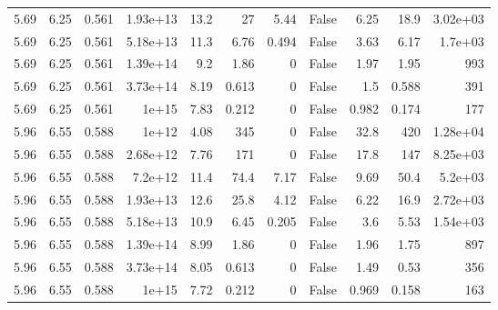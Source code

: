 \begin{table}
\begin{tabular}{rrrrrrrrrrr}
5.69 & 6.25 & 0.561 & 1.93e+13 & 13.2 & 27 & 5.44 & False & 6.25 & 18.9 & 3.02e+03 \\
5.69 & 6.25 & 0.561 & 5.18e+13 & 11.3 & 6.76 & 0.494 & False & 3.63 & 6.17 & 1.7e+03 \\
5.69 & 6.25 & 0.561 & 1.39e+14 & 9.2 & 1.86 & 0 & False & 1.97 & 1.95 & 993 \\
5.69 & 6.25 & 0.561 & 3.73e+14 & 8.19 & 0.613 & 0 & False & 1.5 & 0.588 & 391 \\
5.69 & 6.25 & 0.561 & 1e+15 & 7.83 & 0.212 & 0 & False & 0.982 & 0.174 & 177 \\
5.96 & 6.55 & 0.588 & 1e+12 & 4.08 & 345 & 0 & False & 32.8 & 420 & 1.28e+04 \\
5.96 & 6.55 & 0.588 & 2.68e+12 & 7.76 & 171 & 0 & False & 17.8 & 147 & 8.25e+03 \\
5.96 & 6.55 & 0.588 & 7.2e+12 & 11.4 & 74.4 & 7.17 & False & 9.69 & 50.4 & 5.2e+03 \\
5.96 & 6.55 & 0.588 & 1.93e+13 & 12.6 & 25.8 & 4.12 & False & 6.22 & 16.9 & 2.72e+03 \\
5.96 & 6.55 & 0.588 & 5.18e+13 & 10.9 & 6.45 & 0.205 & False & 3.6 & 5.53 & 1.54e+03 \\
5.96 & 6.55 & 0.588 & 1.39e+14 & 8.99 & 1.86 & 0 & False & 1.96 & 1.75 & 897 \\
5.96 & 6.55 & 0.588 & 3.73e+14 & 8.05 & 0.613 & 0 & False & 1.49 & 0.53 & 356 \\
5.96 & 6.55 & 0.588 & 1e+15 & 7.72 & 0.212 & 0 & False & 0.969 & 0.158 & 163 \\
\bottomrule
\end{tabular}
\end{table}
